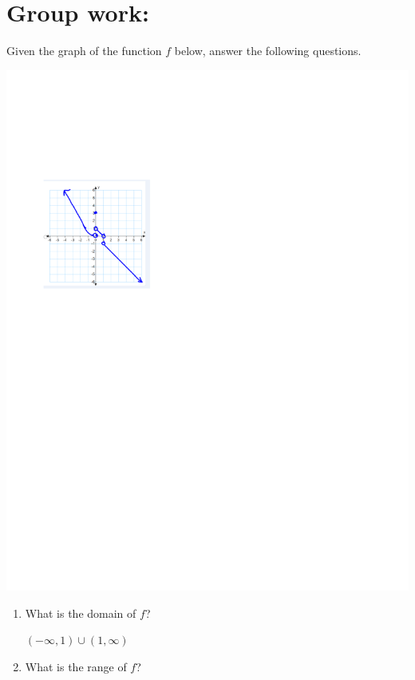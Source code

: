 \documentclass[handout,nooutcomes]{ximera}
\begin{document}
\section*{Group work:}
	\begin{problem}
	 	Given the graph of the function $f$ below, answer the following questions.
			
\begin{image}		
\includegraphics[trim= 80 460 300 170]{Figure3.pdf}
\end{image}	

		\begin{enumerate}
		
			 \item What is the domain of $f$?
			 
			 \begin{freeResponse}			 
			 $(-\infty, 1) \cup (1, \infty)$
			\end{freeResponse}
			 
			 \item What is the range of $f$?
			 

\end{enumerate}
\end{problem}
\end{document}
